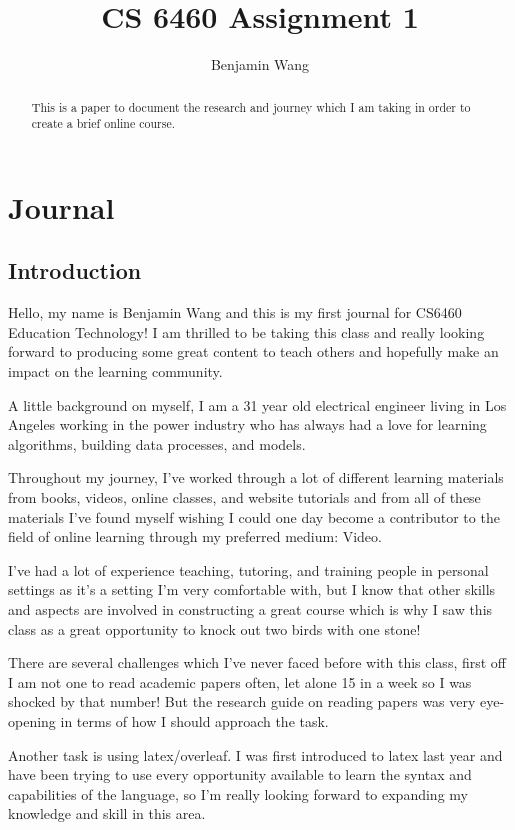 \documentclass[
	letterpaper, %
]{jdf}
\author{Benjamin Wang}
\title{CS 6460 Assignment 1}
\begin{document}

\maketitle

\begin{abstract}
	This is a paper to document the research and journey which I am taking in order to create a brief online course.
\end{abstract}

\section{Journal}
\subsection{Introduction}
Hello, my name is Benjamin Wang and this is my first journal for CS6460 Education Technology! I am thrilled to be taking this class and really looking forward to producing some great content to teach others and hopefully make an impact on the learning community.

A little background on myself, I am a 31 year old electrical engineer living in Los Angeles working in the power industry who has always had a love for learning algorithms, building data processes, and models. 

Throughout my journey, I've worked through a lot of different learning materials from books, videos, online classes, and website tutorials and from all of these materials I've found myself wishing I could one day become a contributor to the field of online learning through my preferred medium: Video. 

I've had a lot of experience teaching, tutoring, and training people in personal settings as it's a setting I'm very comfortable with, but I know that other skills and aspects are involved in constructing a great course which is why I saw this class as a great opportunity to knock out two birds with one stone!

There are several challenges which I've never faced before with this class, first off I am not one to read academic papers often, let alone 15 in a week so I was shocked by that number! But the research guide on reading papers was very eye-opening in terms of how I should approach the task. 

Another task is using latex/overleaf. I was first introduced to latex last year and have been trying to use every opportunity available to learn the syntax and capabilities of the language, so I'm really looking forward to expanding my knowledge and skill in this area. 
\end{document}
